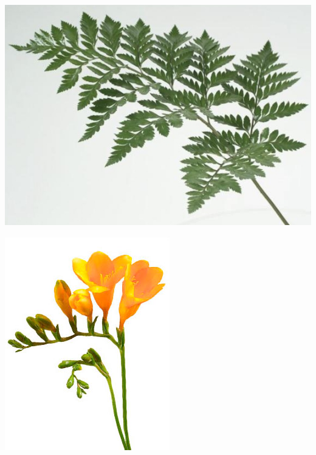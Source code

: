 \documentclass{article}
\begin{document}
\begin{center}
\includegraphics[width=0.9\textheight, angle=90]{../Fern_LeatherLeaf_Leaf.jpg}
\end{center}
\newpage

\begin{center}
\includegraphics[width=0.9\textheight, angle=90]{../Freesia.jpg}
\end{center}
\newpage
\end{document}
